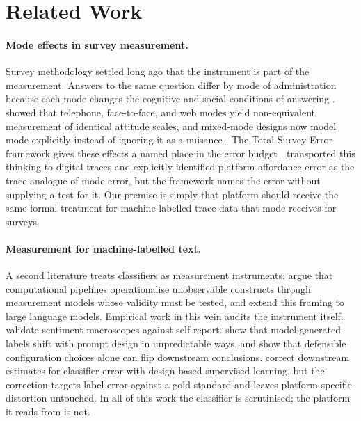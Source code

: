 
\section{Related Work}
\label{sec:related}

\paragraph{Mode effects in survey measurement.}
Survey methodology settled long ago that the instrument is part of the measurement. Answers to the same question differ by mode of administration because each mode changes the cognitive and social conditions of answering \citep{tourangeau2000}. \citet{klausch2013} showed that telephone, face-to-face, and web modes yield non-equivalent measurement of identical attitude scales, and mixed-mode designs now model mode explicitly instead of ignoring it as a nuisance \citep{hox2015}. The Total Survey Error framework gives these effects a named place in the error budget \citep{groves2010}. \citet{sen2021} transported this thinking to digital traces and explicitly identified platform-affordance error as the trace analogue of mode error, but the framework names the error without supplying a test for it. Our premise is simply that platform should receive the same formal treatment for machine-labelled trace data that mode receives for surveys.

\paragraph{Measurement for machine-labelled text.}
A second literature treats classifiers as measurement instruments. \citet{jacobs2021} argue that computational pipelines operationalise unobservable constructs through measurement models whose validity must be tested, and \citet{halterman2025} extend this framing to large language models. Empirical work in this vein audits the instrument itself. \citet{pellert2022} validate sentiment macroscopes against self-report. \citet{atreja2025} show that model-generated labels shift with prompt design in unpredictable ways, and \citet{baumann2025} show that defensible configuration choices alone can flip downstream conclusions. \citet{egami2023} correct downstream estimates for classifier error with design-based supervised learning, but the correction targets label error against a gold standard and leaves platform-specific distortion untouched. In all of this work the classifier is scrutinised; the platform it reads from is not.

